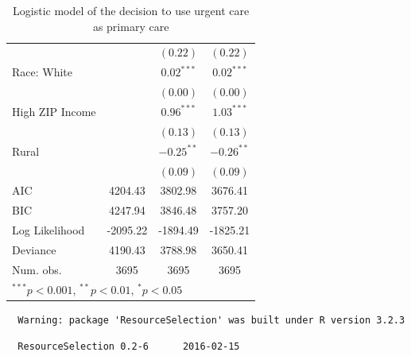 \documentclass[12pt,twoside]{reedthesis}
\begin{document}
\begin{table}
\begin{center}
\begin{small}
\begin{tabular}{l c c c }
                                &               & $(0.22)$      & $(0.22)$      \\
  Race: White                   &               & $0.02^{***}$  & $0.02^{***}$  \\
                                &               & $(0.00)$      & $(0.00)$      \\
  High ZIP Income               &               & $0.96^{***}$  & $1.03^{***}$  \\
                                &               & $(0.13)$      & $(0.13)$      \\
  Rural                         &               & $-0.25^{**}$  & $-0.26^{**}$  \\
                                &               & $(0.09)$      & $(0.09)$      \\
  \hline
  AIC                           & 4204.43       & 3802.98       & 3676.41       \\
  BIC                           & 4247.94       & 3846.48       & 3757.20       \\
  Log Likelihood                & -2095.22      & -1894.49      & -1825.21      \\
  Deviance                      & 4190.43       & 3788.98       & 3650.41       \\
  Num. obs.                     & 3695          & 3695          & 3695          \\
  \hline
  \multicolumn{4}{l}{\tiny{$^{***}p<0.001$, $^{**}p<0.01$, $^*p<0.05$}}
  \end{tabular}
  \end{small}
  \caption{Logistic model of the decision to use urgent care as primary care}
  \label{table:coefficients}
  \end{center}
  \end{table}
  
  \begin{Shaded}
  \begin{Highlighting}[]
  \end{Highlighting}
  \end{Shaded}
  
  \begin{verbatim}
  Warning: package 'ResourceSelection' was built under R version 3.2.3
  \end{verbatim}
  
  \begin{verbatim}
  ResourceSelection 0.2-6      2016-02-15
  \end{verbatim}
  
\end{document}
